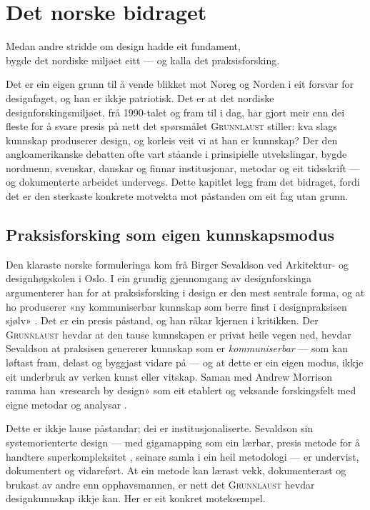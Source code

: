 \chapter{Det norske bidraget}

\begin{motto}
Medan andre stridde om design hadde eit fundament,\\ bygde det nordiske miljøet eitt — og kalla det praksisforsking.
\end{motto}

Det er ein eigen grunn til å vende blikket mot Noreg og Norden i eit forsvar for designfaget, og han er ikkje patriotisk. Det er at det nordiske designforskingsmiljøet, frå 1990-talet og fram til i dag, har gjort meir enn dei fleste for å svare presis på nett det spørsmålet \textsc{Grunnlaust} stiller: kva slags kunnskap produserer design, og korleis veit vi at han er kunnskap? Der den angloamerikanske debatten ofte vart ståande i prinsipielle utvekslingar, bygde nordmenn, svenskar, danskar og finnar institusjonar, metodar og eit tidsskrift — og dokumenterte arbeidet undervegs. Dette kapitlet legg fram det bidraget, fordi det er den sterkaste konkrete motvekta mot påstanden om eit fag utan grunn.

\section{Praksisforsking som eigen kunnskapsmodus}

Den klaraste norske formuleringa kom frå Birger Sevaldson ved Arkitektur- og designhøgskolen i Oslo. I ein grundig gjennomgang av designforskinga argumenterer han for at praksisforsking i design er den mest sentrale forma, og at ho produserer «ny kommuniserbar kunnskap som berre finst i designpraksisen sjølv» \autocite{sevaldson2010discussions}. Det er ein presis påstand, og han råkar kjernen i kritikken. Der \textsc{Grunnlaust} hevdar at den tause kunnskapen er privat heile vegen ned, hevdar Sevaldson at praksisen genererer kunnskap som er \emph{kommuniserbar} — som kan løftast fram, delast og byggjast vidare på — og at dette er ein eigen modus, ikkje eit underbruk av verken kunst eller vitskap. Saman med Andrew Morrison ramma han «research by design» som eit etablert og veksande forskingsfelt med eigne metodar og analysar \autocite{morrison2010getting}.

Dette er ikkje lause påstandar; dei er institusjonaliserte. Sevaldson sin systemorienterte design — med gigamapping som ein lærbar, presis metode for å handtere superkompleksitet \autocite{sevaldson2011giga}, seinare samla i ein heil metodologi \autocite{sevaldson2022complexity} — er undervist, dokumentert og vidareført. At ein metode kan lærast vekk, dokumenterast og brukast av andre enn opphavsmannen, er nett det \textsc{Grunnlaust} hevdar designkunnskap ikkje kan. Her er eit konkret moteksempel.

